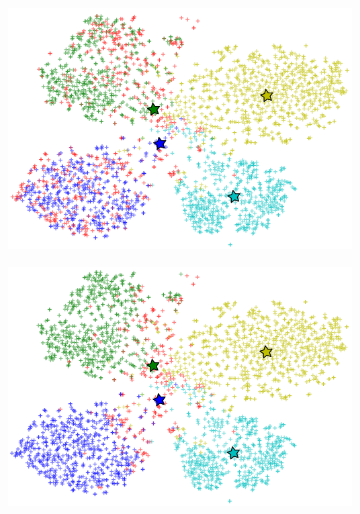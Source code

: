 \documentclass[letterpaper]{article}
\begin{document}
\begin{figure}[t]
\begin{subfigure}[b]{0.25\linewidth}
    \caption{}
    \label{fig:truth}
  \end{subfigure}
%
  \begin{subfigure}[b]{0.25\linewidth}
    \includegraphics[width=\linewidth]{knn}
    \caption{}
\label{fig:knn}
  \end{subfigure}
%
  \begin{subfigure}[b]{0.25\linewidth}
    \includegraphics[width=\linewidth]{kmeans}
    \caption{}
\label{fig:kmeans}
  \end{subfigure}

\end{figure}
\end{document}
